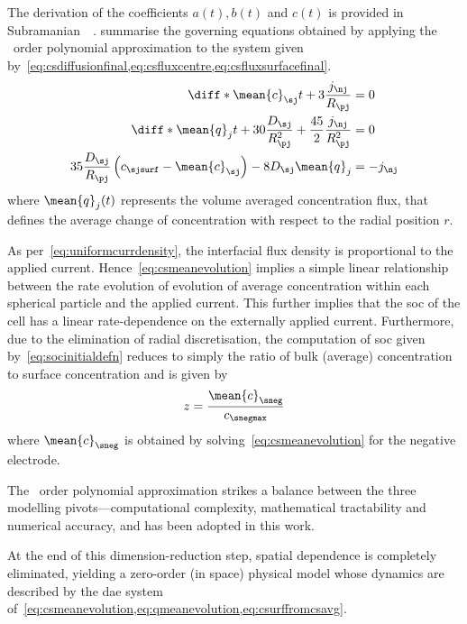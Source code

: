 The     derivation     of     the      coefficients     $a(t),     b(t)$     and
$c(t)$     is     provided    in     Subramanian~\etal{}~\cite{Subramanian2005}.
    summarise   the
governing   equations   obtained    by   applying   the   ~order
polynomial        approximation        to         the        system        given
by~\cref{eq:csdiffusionfinal,eq:csfluxcentre,eq:csfluxsurfacefinal}.
\begin{align}
    \diff*{\mean{c}_\sj}{t} + 3\frac{j_\nj}{R_\pj} &=0 \label{eq:csmeanevolution} \\
    \diff*{\mean{q}_j}{t} + 30\frac{D_\sj}{R_\pj^2} + \frac{45}{2}\frac{j_\nj}{R_\pj^2} &=0 \label{eq:qmeanevolution}\\
    35\frac{D_\sj}{R_\pj}\left(c_\sjsurf - \mean{c}_\sj\right) - 8D_\sj \mean{q}_j &= -j_\nj \label{eq:csurffromcsavg}
\end{align}
where $\mean{q}_j(t)$  represents the  volume averaged concentration  flux, that
defines the average change of concentration  with respect to the radial position
$r$.

As   per~\cref{eq:uniformcurrdensity},   the   interfacial   flux   density   is
proportional to  the applied current. Hence~\cref{eq:csmeanevolution}  implies a
simple linear  relationship between the  rate evolution of evolution  of average
 concentration within each spherical  particle and the applied current.
This further implies that the \gls{soc} of the cell has a linear rate-dependence
on the externally applied current. Furthermore, due to the elimination of radial
discretisation, the  computation of \gls{soc}  given by~\cref{eq:socinitialdefn}
reduces  to  simply  the  ratio  of  bulk  (average)  concentration  to  surface
concentration and is given by
\begin{equation}
    z = \frac{\mean{c}_\sneg}{c_\snegmax}
\end{equation}
where $\mean{c}_\sneg$ is obtained by solving~\cref{eq:csmeanevolution} for the
negative electrode.

The ~order  polynomial approximation  strikes a  balance between
the three modelling pivots---computational complexity, mathematical tractability
and numerical accuracy, and has been adopted in this work.

At   the   end   of    this   dimension-reduction   step,   spatial   dependence
is   completely  eliminated,   yielding   a  zero-order   (in  space)   physical
model    whose    dynamics   are    described    by    the   \gls{dae}    system
of~\cref{eq:csmeanevolution,eq:qmeanevolution,eq:csurffromcsavg}.

